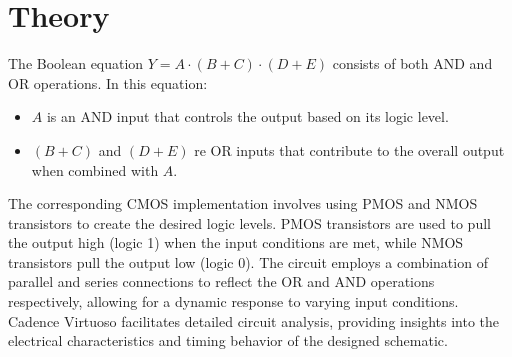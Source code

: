 \documentclass[11pt]{article}
\begin{document}
\section{Theory}
The Boolean equation $Y=A\cdot(B+C)\cdot(D+E)$ consists of both AND and OR operations. In this equation:
\begin{itemize}
    \item $A$ is an AND input that controls the output based on its logic level.
    \item $(B+C)$ and $(D+E)$ re OR inputs that contribute to the overall output when combined with $A$.
\end{itemize}
The corresponding CMOS implementation involves using PMOS and NMOS transistors to create the desired logic levels. PMOS transistors are used to pull the output high (logic 1) when the input conditions are met, while NMOS transistors pull the output low (logic 0). The circuit employs a combination of parallel and series connections to reflect the OR and AND operations respectively, allowing for a dynamic response to varying input conditions. Cadence Virtuoso facilitates detailed circuit analysis, providing insights into the electrical characteristics and timing behavior of the designed schematic.
\newpage
\end{document}
